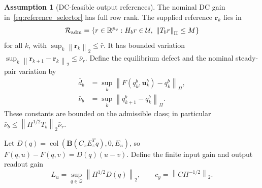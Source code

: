\documentclass[journal]{IEEEtran}
\theoremstyle{plain}
\theoremstyle{definition}
\newtheorem{assumption}{Assumption}
\newcommand{\vr}{\mathbf{r}}
\newcommand{\vu}{\mathbf{u}}
\newcommand{\mB}{\mathbf{B}}
\newcommand{\R}{\mathbb{R}}
\newcommand{\norm}[1]{\left\lVert #1\right\rVert}
\newcommand{\col}{\operatorname{col}}
\begin{document}
\begin{assumption}[DC-feasible output references]
\label{ass:reference}
The nominal DC gain in~\eqref{eq:reference_selector} has full row rank. The supplied reference $\vr_k$ lies in
\begin{equation}
\mathcal R_{\rm adm}=\{r\in\R^{p_y}:H_br\in\mathcal U,
\ \norm{T_br}_\Pi\le M\}
\label{eq:reference_admissibility}
\end{equation}
for all $k$, with $\sup_k\norm{\vr_k}_2\le\bar r$. It has bounded variation $\sup_k\norm{\vr_{k+1}-\vr_k}_2\le\bar\nu_r$. Define the equilibrium defect and the nominal steady-pair variation by
\begin{equation}
\begin{aligned}
\bar d_b&=\sup_k\norm{F(q_k^b,\vu_k^b)-q_k^b}_\Pi,\\
\bar\nu_b&=\sup_k\norm{q_{k+1}^b-q_k^b}_\Pi.
\end{aligned}
\label{eq:reference_budgets}
\end{equation}
These constants are bounded on the admissible class; in particular
$\bar\nu_b\le\norm{\Pi^{1/2}T_b}_2\bar\nu_r$.
\end{assumption}

Let $D(q)=\col(\mB(C_xE_z^Tq),0,E_u)$, so $F(q,u)-F(q,v)=D(q)(u-v)$. Define the finite input gain and output readout gain
\begin{equation}
L_u=\sup_{q\in\mathcal Q}\norm{\Pi^{1/2}D(q)}_2,\qquad
c_y=\norm{C\Pi^{-1/2}}_2.
\label{eq:input_output_gains}
\end{equation}
\end{document}
